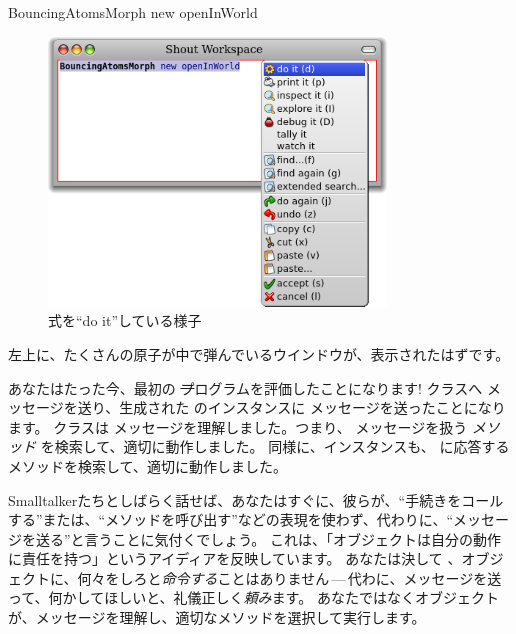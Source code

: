 \documentclass[a4paper,10pt,twoside]{book}
\begin{document}

\begin{code}{}
BouncingAtomsMorph new openInWorld
\end{code}


\begin{figure}[htb]
\centerline {\includegraphics[width=0.8\textwidth]{Doit}}
\caption{式を``do it''している様子}
\end{figure}

左上に、たくさんの原子が中で弾んでいるウインドウが、表示されたはずです。

あなたはたった今、最初の \st プログラムを評価したことになります!
\bam クラスへ  メッセージを送り、生成された \bam のインスタンスに  メッセージを送ったことになります。
\bam クラスは  メッセージを理解しました。つまり、 メッセージを扱う \emph{メソッド} を検索して、適切に動作しました。
同様に、\bam インスタンスも、 に応答するメソッドを検索して、適切に動作しました。

Smalltalkerたちとしばらく話せば、あなたはすぐに、彼らが、``手続きをコールする''または、``メソッドを呼び出す''などの表現を使わず、代わりに、``メッセージを送る''と言うことに気付くでしょう。
これは、「オブジェクトは自分の動作に責任を持つ」というアイディアを反映しています。
あなたは決して 、オブジェクトに、何々をしろと\emph{命令する}ことはありません\,---\,代わに、メッセージを送って、何かしてほしいと、礼儀正しく\emph{頼み}ます。
あなたではなくオブジェクトが、メッセージを理解し、適切なメソッドを選択して実行します。
\end{document}
